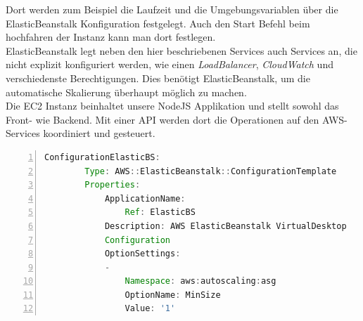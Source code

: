 \documentclass[a4paper, 12pt]{scrreprt}
\renewcommand\_{\textunderscore\allowbreak}
\begin{document}
\bigskip
\noindent Dort werden zum Beispiel die Laufzeit und die Umgebungsvariablen über die ElasticBeanstalk Konfiguration festgelegt. Auch den Start Befehl beim hochfahren der Instanz kann man dort festlegen.\\
ElasticBeanstalk legt neben den hier beschriebenen Services auch Services an, die nicht explizit konfiguriert werden, wie einen \textit{LoadBalancer}, \textit{CloudWatch} und verschiedenste Berechtigungen. Dies benötigt ElasticBeanstalk, um die automatische Skalierung überhaupt möglich zu machen.\\[0.5cm]
Die EC2 Instanz beinhaltet unsere NodeJS Applikation und stellt sowohl das Front- wie Backend. Mit einer API werden dort die Operationen auf den AWS-Services koordiniert und gesteuert. 
\bigskip
\begin{lstlisting}[xleftmargin=\parindent,numbers=left,numberstyle=\small,numbersep=8pt,frame=L,mathescape=true, basicstyle=\small, language=Java, lineskip={1.0pt}]
ConfigurationElasticBS:
        Type: AWS::ElasticBeanstalk::ConfigurationTemplate
        Properties:
            ApplicationName:
                Ref: ElasticBS
            Description: AWS ElasticBeanstalk VirtualDesktop 
            Configuration
            OptionSettings:
            -
                Namespace: aws:autoscaling:asg
                OptionName: MinSize
                Value: '1'
\end{lstlisting}
\end{document}
